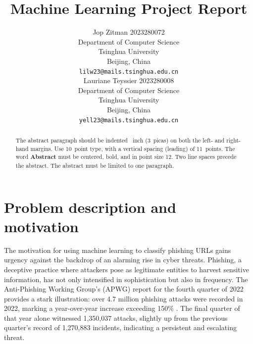 \documentclass{article}
\title{Machine Learning Project Report}
\author{
    Jop Zitman 2023280072\\
    Department of Computer Science\\
    Tsinghua University\\
    Beijing, China \\
    \texttt{lilw23@mails.tsinghua.edu.cn} \\
    \And
    Lauriane Teyssier 2023280008\\
    Department of Computer Science\\
    Tsinghua University\\
    Beijing, China \\
    \texttt{yell23@mails.tsinghua.edu.cn} \\
}
\begin{document}
    \maketitle

    \begin{abstract}
        The abstract paragraph should be indented ~inch (3~picas) on
        both the left- and right-hand margins.
        Use 10~point type, with a vertical
        spacing (leading) of 11~points.
        The word \textbf{Abstract} must be centered,
        bold, and in point size 12.
        Two line spaces precede the abstract.
        The abstract must be limited to one paragraph.
    \end{abstract}

    \newpage
    \tableofcontents
    \newpage


%


    \section{Problem description and motivation}\label{sec:problem-description-and-motivation}

    The motivation for using machine learning to classify phishing URLs gains urgency against the backdrop of an alarming rise in cyber threats.
    Phishing, a deceptive practice where attackers pose as legitimate entities to harvest sensitive information, has not only intensified in sophistication but also in frequency.
    The Anti-Phishing Working Group's (APWG) report for the fourth quarter of 2022 provides a stark illustration: over 4.7 million phishing attacks were recorded in 2022, marking a year-over-year increase exceeding 150\% \cite{PhishingActivityTrendsReport}.
    The final quarter of that year alone witnessed 1,350,037 attacks, slightly up from the previous quarter's record of 1,270,883 incidents, indicating a persistent and escalating threat.
\end{document}

